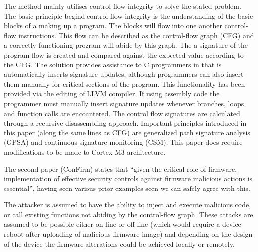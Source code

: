 The method mainly utilises control-flow integrity to solve the stated problem. The basic principle begind control-flow integrity is the understanding of the basic blocks of a making up a program. The blocks will flow into one another control-flow instructions. This flow can be described as the control-flow graph (CFG) and a correctly functioning program will abide by this graph. The a signature of the program flow is created and compared against the expected value according to the CFG. The solution provides assistance to C programmers in that is automatically inserts signature updates, although programmers can also insert them manually for critical sections of the program. This functionality has been provided via the editing of LLVM compiler. If using assembly code the programmer must manually insert signature updates whenever branches, loops and function calls are encountered. The control flow signatures are calculated through a  recursive disassembling approach.  Important principles introduced in this paper (along the same lines as CFG) are generalized path signature analysis (GPSA) and continuous-signature monitoring (CSM).  This paper does require modifications to be made to Cortex-M3 architecture.



The second paper \cite{Wang2016} (ConFirm) states that ``given the critical role of firmware, implementation of effective security controls against firmware malicious actions is essential'', having seen various prior examples seen we can safely agree with this. 

The attacker is assumed to have the ability to inject and execute malicious code, or call existing functions not abiding by the control-flow graph. These attacks are assumed to be possible either on-line or off-line (which would require a device reboot after uploading of malicious firmware image) and depending on the design of the device the firmware alterations could be achieved locally or remotely.


